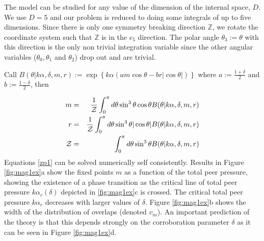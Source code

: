 \documentclass[twocolumn,showpacs]{revtex4-1}
\begin{document}
The model can be studied for any value of the dimension of the
internal space, $D$. We use $D=5$ and our problem is reduced to doing some
integrals of up to five dimensions.
Since there is only one symmetry breaking direction $\mathbb{Z}$, 
we rotate the coordinate system such that 
$\mathbb{Z}$  is in the $\hat{e}_5$ direction. The polar angle
$\theta_3:=\theta$ with this direction is the only non trivial integration
variable since the 
other angular variables ($\theta_0, \theta_1 $ and $\theta_2$) drop
out and are trivial.


Call
$B(\theta|k\alpha,\delta,m,r):=\exp\left\{ k\alpha
\left( a m\cos \theta - b r |\cos \theta| \right) \right\}$
where $a:=\frac{1+\delta}{2}$  and $b:=\frac{1-\delta}{2}$, then 

\begin{eqnarray}
m&=& \frac{1}{{\cal Z}}\int_0^\pi
 d\theta \sin^3 \theta \cos \theta B(\theta|k\alpha,\delta,m,r)
\nonumber\\
r&=& \frac{1}{{\cal Z}}\int_0^\pi d\theta \sin^3 \theta |\cos
\theta| B(\theta|k\alpha,\delta,m,r)
\nonumber\\
{\cal Z}&=& \int_0^\pi
 d\theta \sin^3 \theta B(\theta|k\alpha,\delta,m,r)
 \label{zp1}
\end{eqnarray}
Equations  \ref{zp1} can be solved numerically self
consistently. Results in Figure  \ref{fig:mag1ex}a 
show the fixed points $m$ as a function of the total peer pressure, showing the existence of a 
phase transition as the critical line of total peer pressure 
 $k\alpha_c(\delta)$ depicted in \ref{fig:mag1ex}c   is crossed. 
The  critical  total peer pressure $k\alpha_c$ decreases with
larger values of $\delta$.  Figure \ref{fig:mag1ex}b shows the
width of the distribution of overlaps  (denoted $v_m$). An important
 prediction of the theory is that this depends strongly on the
 corroboration parameter $\delta$ as it can be seen in Figure \ref{fig:mag1ex}d. 
\end{document}

